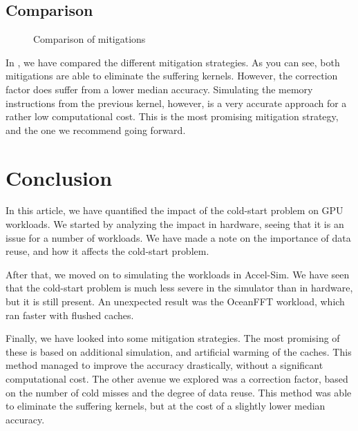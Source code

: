 \documentclass[5p,numvwe]{elsarticle}
\begin{document}
    \subsection{Comparison}\label{subsec:mitig-compare}
    \begin{figure}[hb]
        \centering
        \caption{Comparison of mitigations}
        \label{fig:mitig-compare}
    \end{figure}

    In , we have compared the different mitigation strategies.
    As you can see, both mitigations are able to eliminate the suffering kernels.
    However, the correction factor does suffer from a lower median accuracy.
    Simulating the memory instructions from the previous kernel, however, is a very accurate approach for a rather low computational cost.
    This is the most promising mitigation strategy, and the one we recommend going forward.

    \section{Conclusion}\label{sec:concl}
    In this article, we have quantified the impact of the cold-start problem on GPU workloads.
    We started by analyzing the impact in hardware, seeing that it is an issue for a number of workloads.
    We have made a note on the importance of data reuse, and how it affects the cold-start problem.

    After that, we moved on to simulating the workloads in Accel-Sim.
    We have seen that the cold-start problem is much less severe in the simulator than in hardware, but it is still present.
    An unexpected result was the OceanFFT workload, which ran faster with flushed caches.

    Finally, we have looked into some mitigation strategies.
    The most promising of these is based on additional simulation, and artificial warming of the caches.
    This method managed to improve the accuracy drastically, without a significant computational cost.
    The other avenue we explored was a correction factor, based on the number of cold misses and the degree of data reuse.
    This method was able to eliminate the suffering kernels, but at the cost of a slightly lower median accuracy.

    
    
\end{document}
